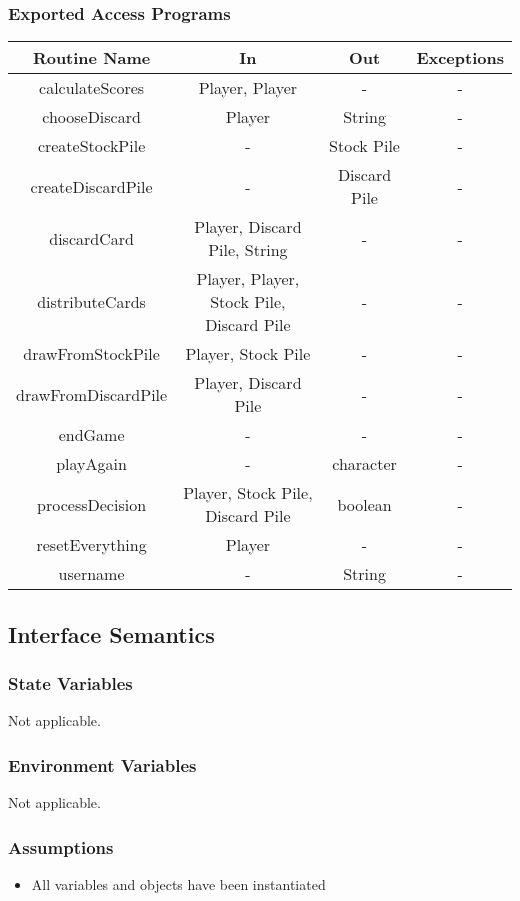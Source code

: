 \documentclass[12pt, titlepage]{article}
\begin{document}
\subsubsection{Exported Access Programs}
\begin{tabular}{|c|c|c|c|}
    \hline
    \textbf{Routine Name} & \textbf{In} & \textbf{Out} & \textbf{Exceptions} \\
    \hline
    calculateScores & Player, Player & - & - \\
    \hline
    chooseDiscard & Player & String & - \\
    \hline
    createStockPile & - & Stock Pile & - \\
    \hline
    createDiscardPile & - & Discard Pile & - \\
    \hline
    discardCard & Player, Discard Pile, String & - & - \\
    \hline
    distributeCards & Player, Player, Stock Pile, Discard Pile & - & - \\
    \hline
    drawFromStockPile & Player, Stock Pile & - & - \\
    \hline
    drawFromDiscardPile & Player, Discard Pile & - & - \\
    \hline
    endGame & - & - & - \\
    \hline
    playAgain & - & character & - \\
    \hline
    processDecision & Player, Stock Pile, Discard Pile & boolean & - \\
    \hline
    resetEverything & Player & - & - \\
    \hline
    username & - & String & - \\
    \hline
\end{tabular}

\subsection{Interface Semantics}
\subsubsection{State Variables}
Not applicable.

\subsubsection{Environment Variables}
Not applicable.

\subsubsection{Assumptions}
\begin{itemize}
    \item All variables and objects have been instantiated
\end{itemize}
\end{document}
